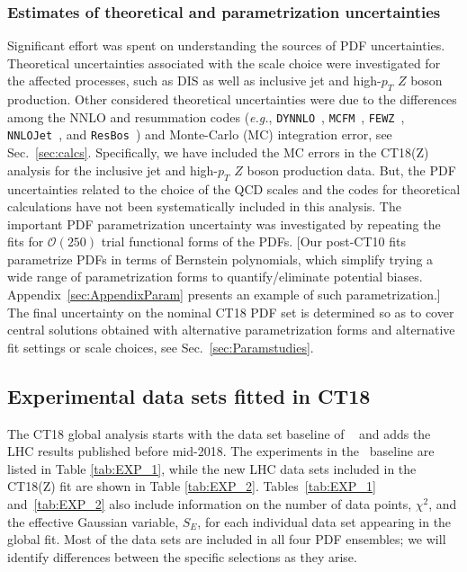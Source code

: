 \subsubsection{Estimates of theoretical and parametrization uncertainties}
Significant effort was spent on understanding the sources
of PDF uncertainties. Theoretical uncertainties associated with the
scale choice were investigated for the affected processes, such as
DIS as well as inclusive jet and high-$p_{T}$ $Z$ boson production.
Other considered theoretical uncertainties were due 
to the differences among the NNLO and resummation codes ({\it e.g.}, 
\texttt{DYNNLO}~\cite{Catani:2007vq,Catani:2009sm}, 
\texttt{MCFM}~\cite{Campbell:2010ff, Boughezal:2016wmq, MCFM8}, 
\texttt{FEWZ}~\cite{Gavin:2010az, Gavin:2012sy, Li:2012wna},
\texttt{NNLOJet}~\cite{Ridder:2015dxa,Gehrmann-DeRidder:2017mvr,Currie:2016bfm,Currie:2017ctp}, and
\texttt{ResBos}~\cite{Ladinsky:1993zn, Balazs:1997xd})
and Monte-Carlo (MC) integration error, see Sec.~\ref{sec:calcs}.
Specifically, we have included the MC errors in the CT18(Z) analysis for the inclusive jet and high-$p_T$ $Z$ boson production data. But, the PDF  uncertainties related to the choice of the QCD scales and the codes for theoretical calculations have not been systematically included in this analysis. 
The important PDF parametrization uncertainty was investigated by repeating
the fits for $\mathcal{O}(250)$ trial functional forms of the PDFs. [Our post-CT10
fits parametrize PDFs in terms of Bernstein polynomials, which simplify
trying a wide range of parametrization forms to quantify/eliminate
potential biases. Appendix~\ref{sec:AppendixParam} presents an example of such parametrization.] The final uncertainty on the nominal CT18 PDF set is determined so as to cover central solutions obtained with alternative parametrization forms and alternative fit settings or scale choices, see Sec.~\ref{sec:Paramstudies}.

\subsection{Experimental data sets fitted in CT18}
\label{sec:data_overview}

The CT18 global analysis starts with the data set baseline of \CTHERAII~\cite{Hou:2016nqm} and adds the LHC results published before mid-2018. The experiments in the \CTHERAII~baseline
are listed in Table \ref{tab:EXP_1}, while the new LHC data sets included in the CT18(Z) fit are shown in Table \ref{tab:EXP_2}. 
Tables~\ref{tab:EXP_1} and~\ref{tab:EXP_2}
also include information on the number of data points, $\chi^2$, and the effective Gaussian variable, $S_E$, for each individual data set appearing in the global fit.   
Most of the data sets are included in all four PDF ensembles; we  will identify differences between the specific selections as they arise.


